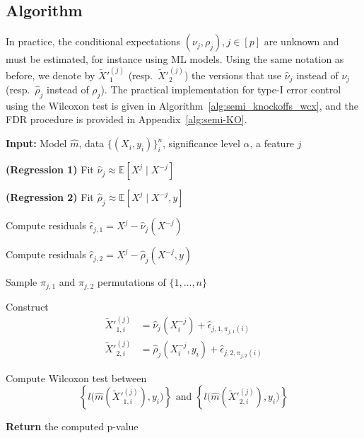 \documentclass{article}
\theoremstyle{plain}
\theoremstyle{definition}
\theoremstyle{remark}
\begin{document}
\subsection{Algorithm}
In practice, the conditional expectations $(\nu_j,\rho_j),j\in[p]$ are unknown and must be estimated, for instance using ML models. Using the same notation as before, we denote by $\widetilde{X}'^{(j)}_1$ (resp.\ $\widetilde{X}'^{(j)}_2$) the versions that use $\widehat{\nu}_j$ instead of $\nu_j$ (resp.\ $\widehat{\rho}_j$ instead of $\rho_j$). The practical implementation for type-I error control using the Wilcoxon test is given in Algorithm~\ref{alg:semi_knockoffs_wcx}, and the FDR procedure is provided in Appendix~\ref{alg:semi-KO}.
\begin{algorithm}[H]
\caption{Semi-knockoffs Wilcoxon (\texttt{SKO-Wcx})}
\label{alg:semi_knockoffs_wcx}
\begin{algorithmic}[1]
\item[] \textbf{Input:} Model $\widehat{m}$, data $\{(X_i,y_i)\}_i^n$, significance level $\alpha$, a feature $j$
    \item[] \quad \textbf{(Regression 1)} Fit $\widehat{\nu}_j \approx \mathbb{E}[X^j \mid X^{-j}]$
    \item[] \quad \textbf{(Regression 2)} Fit $\widehat{\rho}_j \approx \mathbb{E}[X^j \mid X^{-j}, y]$
    \item[] Compute residuals $\widehat{\epsilon}_{j,1} = X^j -\widehat{\nu}_j(X^{-j})$
    \item[] Compute residuals $\widehat{\epsilon}_{j,2} = X^j - \widehat{\rho}_j(X^{-j}, y)$
    \item[] Sample $\pi_{j,1}$ and $\pi_{j,2}$ permutations of $\{1,\dots,n\}$
    \item[] Construct 
    \begin{align*}
        \widetilde{X}'^{(j)}_{1,i}
        &= \widehat{\nu}_j(X^{-j}_i)
        + \widehat{\epsilon}_{j,1,\pi_{j,1}(i)}\\
        \widetilde{X}'^{(j)}_{2,i}
        &= \widehat{\rho}_j(X^{-j}_i, y_i)
        + \widehat{\epsilon}_{j,2,\pi_{j,2}(i)}
    \end{align*}
    \item[] Compute Wilcoxon test  between %
    \[
        \left\{l\bigl(\widehat{m}(\widetilde{X}'^{(j)}_{1,i}), y_i\bigr)\right\}
        \text{ and }
        \left\{l\bigl(\widehat{m}(\widetilde{X}'^{(j)}_{2,i}), y_i\bigr)\right\}
    \]
\item[] \textbf{Return} the computed p-value
\end{algorithmic}
\label{alg:semi-KO-wilcox}
\end{algorithm}
\end{document}

